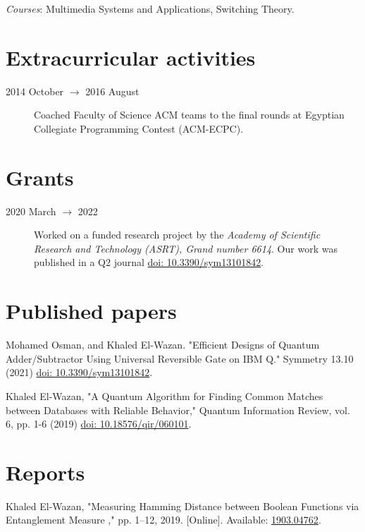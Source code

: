 \documentclass[margin,line]{resume}
\newcommand*{\doi}[1]{\href{http://dx.doi.org/#1}{doi: #1}}
\begin{document}
\begin{resume}
\begin{description}
			\emph{Courses}: Multimedia Systems and Applications, Switching Theory.

	\end{description}



	\section{\mysidestyle Extracurricular activities}\vspace{1mm}
	\begin{description}
		\item[2014 October $\rightarrow$ 2016 August] Coached Faculty of Science ACM teams to the final rounds at Egyptian Collegiate Programming Contest (ACM-ECPC).

	\end{description}

	\section{\mysidestyle Grants}
	\begin{description}
		\item[2020 March $\rightarrow$ 2022] Worked on a funded research project by the \textit{Academy of Scientific Research and Technology (ASRT), Grand number 6614}. Our work was published in a Q2 journal \doi{10.3390/sym13101842}.
	\end{description}


	\section{ \mysidestyle Published papers}

	Mohamed Osman, and Khaled El-Wazan. "Efficient Designs of Quantum Adder/Subtractor Using Universal Reversible Gate on IBM Q." Symmetry 13.10 (2021) \doi{10.3390/sym13101842}.


	Khaled El-Wazan, "A Quantum Algorithm for Finding Common Matches between Databases with Reliable Behavior," Quantum Information Review, vol. 6, pp. 1-6 (2019) \doi{10.18576/qir/060101}.


	\section{\mysidestyle Reports}

	Khaled El-Wazan, "Measuring Hamming Distance between Boolean Functions via Entanglement Measure ,"  pp. 1--12, 2019.
		[Online]. Available: \href{http://arxiv.org/abs/1903.04762}{1903.04762}.




\end{resume}
\end{document}
